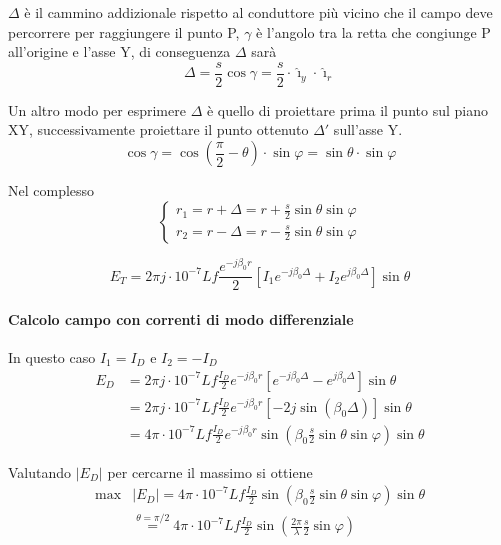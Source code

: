 
$\Delta$ è il cammino addizionale rispetto al conduttore più vicino
che il campo deve percorrere per raggiungere il punto P,
$\gamma$ è l'angolo tra la retta che congiunge P all'origine e l'asse Y, di conseguenza
$\Delta$ sarà 
$$
\Delta = \frac{s}{2}\cos\gamma = \frac{s}{2}\cdot \hat{\imath}_y\cdot \hat{\imath}_r
$$

Un altro modo per esprimere $\Delta$ è quello di proiettare prima il punto sul piano XY, successivamente
proiettare il punto ottenuto $\Delta'$ sull'asse Y.
$$
\cos\gamma = \cos\left(\frac{\pi}{2} - \theta\right) \cdot \sin\varphi = \sin\theta \cdot \sin\varphi
$$

Nel complesso
$$
\begin{cases}
r_1 = r + \Delta = r + \frac{s}{2} \sin\theta \sin\varphi \\
r_2 = r - \Delta = r - \frac{s}{2} \sin\theta \sin\varphi
\end{cases}
$$

$$
E_T = 2 \pi j \cdot 10^{-7} L f \frac{e^{-j \beta_0 r}}{2} \left[I_1 e^{-j \beta_0 \Delta} + I_2 e^{j \beta_0 \Delta} \right]\sin\theta
$$

\paragraph{Calcolo campo con correnti di modo differenziale}
In questo caso $I_1 = I_D$ e $I_2 = -I_D$
\begin{equation*}
 \begin{split}
E_D & = 2 \pi j \cdot 10^{-7} L f \frac{I_D}{2}e^{-j \beta_0 r} \left[e^{-j \beta_0 \Delta} - e^{j \beta_0 \Delta} \right]\sin\theta \\
 & = 2 \pi j \cdot 10^{-7} L f \frac{I_D}{2}e^{-j \beta_0 r} \left[-2j\sin(\beta_0\Delta)\right]\sin\theta \\ %
 & = 4\pi\cdot10^{-7}Lf\frac{I_D}{2}e^{-j\beta_0 r} \sin\left(\beta_0 \frac{s}{2} \sin\theta \sin\varphi \right)\sin\theta
  \end{split}
\end{equation*}

Valutando $\left|E_D\right|$ per cercarne il massimo si ottiene
\begin{equation*}
 \begin{split}
\text{max}&\left|E_D\right| = 4\pi\cdot10^{-7}Lf\frac{I_D}{2}\sin\left(\beta_0 \frac{s}{2} \sin\theta \sin\varphi \right)\sin\theta \\
& \stackrel{\theta = \pi/2}{=} 4\pi\cdot10^{-7}Lf\frac{I_D}{2}\sin\left(\frac{2\pi}{\lambda} \frac{s}{2} \sin\varphi \right) 
  \end{split}
\end{equation*}

